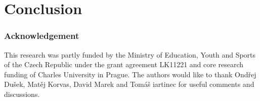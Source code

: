 \chapter{Conclusion}
\label{cha:conclusion}


\subsection*{Acknowledgement}
\label{sub:acknowledgement}
This research was partly funded by the Ministry of Education, Youth and Sports
of the Czech Republic under the grant agreement LK11221 and core research
funding of Charles University in Prague. The authors would like to thank
Ondřej Dušek, Matěj Korvas, David Marek and Tomáš iartinec for useful comments and discussions.  
